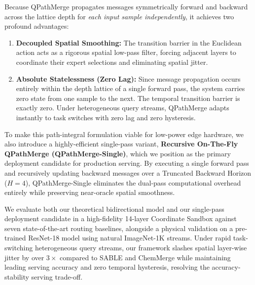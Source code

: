 Because QPathMerge propagates messages symmetrically forward and backward across the lattice depth for \emph{each input sample independently}, it achieves two profound advantages:
\begin{enumerate}
    \item \textbf{Decoupled Spatial Smoothing:} The transition barrier in the Euclidean action acts as a rigorous spatial low-pass filter, forcing adjacent layers to coordinate their expert selections and eliminating spatial jitter.
    \item \textbf{Absolute Statelessness (Zero Lag):} Since message propagation occurs entirely within the depth lattice of a single forward pass, the system carries zero state from one sample to the next. The temporal transition barrier is exactly zero. Under heterogeneous query streams, QPathMerge adapts instantly to task switches with zero lag and zero hysteresis.
\end{enumerate}

To make this path-integral formulation viable for low-power edge hardware, we also introduce a highly-efficient single-pass variant, \textbf{Recursive On-The-Fly QPathMerge (QPathMerge-Single)}, which we position as the primary deployment candidate for production serving. By executing a single forward pass and recursively updating backward messages over a Truncated Backward Horizon ($H=4$), QPathMerge-Single eliminates the dual-pass computational overhead entirely while preserving near-oracle spatial smoothness.

We evaluate both our theoretical bidirectional model and our single-pass deployment candidate in a high-fidelity 14-layer Coordinate Sandbox against seven state-of-the-art routing baselines, alongside a physical validation on a pre-trained ResNet-18 model using natural ImageNet-1K streams. Under rapid task-switching heterogeneous query streams, our framework slashes spatial layer-wise jitter by over $3\times$ compared to SABLE and ChemMerge while maintaining leading serving accuracy and zero temporal hysteresis, resolving the accuracy-stability serving trade-off.
